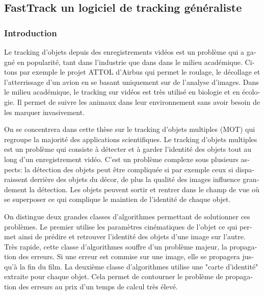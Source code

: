 \begin{otherlanguage}{french}
\subsubsection*{}
\subsection*{FastTrack un logiciel de tracking généraliste}
\subsubsection*{Introduction}
Le tracking d'objets depuis des enregistrements vidéos est un problème qui a gagné en popularité, tant dans l'industrie que dans dans le milieu académique. Citons par exemple le projet ATTOL d'Airbus qui permet le roulage, le décollage et l'atterrissage d'un avion en se basant uniquement sur de l'analyse d'images. Dans le milieu académique, le tracking sur vidéos est très utilisé en biologie et en écologie. Il permet de suivre les animaux dans leur environnement sans avoir besoin de les marquer invasivement.

On se concentrera dans cette thèse sur le tracking d'objets multiples (MOT) qui regroupe la majorité des applications scientifiques. Le tracking d'objets multiples est un problème qui consiste à détecter et à garder l'identité des objets tout au long d'un enregistrement vidéo. C'est un problème complexe sous plusieurs aspects: la détection des objets peut être compliquée si par exemple ceux si disparaissent derrière des objets du décor, de plus la qualité des images influence grandement la détection. Les objets peuvent sortir et rentrer dans le champ de vue où se superposer ce qui complique le maintien de l'identité de chaque objet.

On distingue deux grandes classes d'algorithmes permettant de solutionner ces problèmes. Le premier utilise les paramètres cinématiques de l'objet ce qui permet ainsi de prédire et retrouver l'identité des objets d'une image sur l'autre. Très rapide, cette classe d'algorithmes souffre d'un problème majeur, la propagation des erreurs. Si une erreur est commise sur une image, elle se propagera jusqu'à la fin du film. La deuxième classe d'algorithmes utilise une "carte d'identité" extraite pour chaque objet. Cela permet de contourner le problème de propagation des erreurs au prix d'un temps de calcul très élevé.


\end{otherlanguage}
